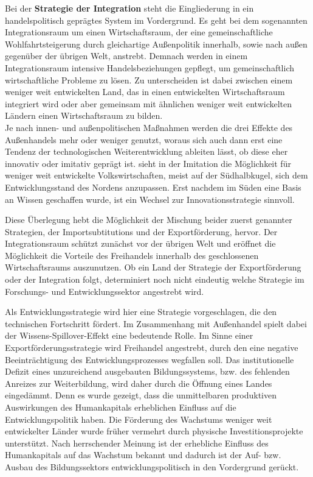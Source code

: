 Bei der \textbf{Strategie der Integration} steht die Eingliederung in ein handelspolitisch gepr{\"a}gtes System im Vordergrund. Es geht bei dem sogenannten Integrationsraum um einen Wirtschaftsraum, der eine gemeinschaftliche Wohlfahrtsteigerung durch gleichartige Au{\ss}enpolitik innerhalb, sowie nach au{\ss}en gegen{\"u}ber der {\"u}brigen Welt, anstrebt. Demnach werden in einem Integrationsraum intensive Handelsbeziehungen gepflegt, um gemeinschaftlich wirtschaftliche Probleme zu l{\"o}sen. Zu unterscheiden ist dabei zwischen einem weniger weit entwickelten Land, das in einen entwickelten Wirtschaftsraum integriert wird oder aber gemeinsam mit {\"a}hnlichen weniger weit entwickelten L{\"a}ndern einen Wirtschaftsraum zu bilden.\\


Je nach innen- und au{\ss}enpolitischen Ma{\ss}nahmen werden die drei Effekte des Au{\ss}enhandels mehr oder weniger genutzt, woraus sich auch dann erst eine Tendenz der technologischen Weiterentwicklung ableiten l{\"a}sst, ob diese eher innovativ oder imitativ gepr{\"a}gt ist. 
\citet{Glass.1999} sieht in der Imitation die M{\"o}glichkeit f{\"u}r weniger weit entwickelte Volkswirtschaften, meist auf der S{\"u}dhalbkugel, sich dem Entwicklungsstand des Nordens anzupassen. Erst nachdem im S{\"u}den eine Basis an Wissen geschaffen wurde, ist ein Wechsel zur Innovationsstrategie sinnvoll. \newline 


Diese {\"U}berlegung hebt die M{\"o}glichkeit der Mischung beider zuerst genannter Strategien, der Importsubtitutions und der Exportf{\"o}rderung, hervor. Der Integrationsraum sch{\"u}tzt zun{\"a}chst vor der {\"u}brigen Welt und er{\"o}ffnet die M{\"o}glichkeit die Vorteile des Freihandels innerhalb des geschlossenen Wirtschaftsraums auszunutzen. Ob ein Land der Strategie der Exportf{\"o}rderung oder der Integration folgt, determiniert noch nicht eindeutig welche Strategie im Forschungs- und Entwicklungssektor angestrebt wird.
\bigskip

Als Entwicklungsstrategie wird hier eine Strategie vorgeschlagen, die den technischen Fortschritt f{\"o}rdert. Im Zusammenhang mit Au{\ss}enhandel spielt dabei der Wissens-Spillover-Effekt eine bedeutende Rolle. Im Sinne einer Exportf{\"o}rderungsstrategie wird Freihandel angestrebt, durch den eine negative Beeintr{\"a}chtigung des Entwicklungsprozesses wegfallen soll. Das institutionelle Defizit eines unzureichend ausgebauten Bildungssystems, bzw. des fehlenden Anreizes zur Weiterbildung, wird daher durch die {\"O}ffnung eines Landes einged{\"a}mmt. Denn es wurde gezeigt, dass die unmittelbaren produktiven Auswirkungen des Humankapitals erheblichen Einfluss auf die Entwicklungspolitik haben. Die F{\"o}rderung des Wachstums weniger weit entwickelter L{\"a}nder wurde fr{\"u}her vermehrt durch physische Investitionsprojekte unterst{\"u}tzt. Nach herrschender Meinung ist der erhebliche Einfluss des Humankapitals auf das Wachstum bekannt und dadurch ist der Auf- bzw. Ausbau des Bildungssektors entwicklungspolitisch in den Vordergrund ger{\"u}ckt.\\


